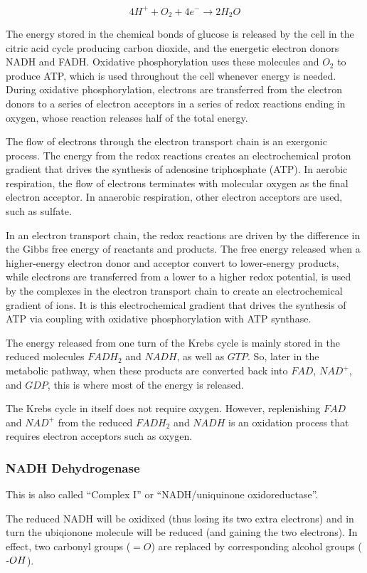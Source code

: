 \documentclass{article}
\def\mhyphen{{\hbox{-}}}
\begin{document}
\[
    4H^+ + O_2 + 4e^- \rightarrow 2H_2O
\]

The energy stored in the chemical bonds of glucose is released by the cell in the citric
acid cycle producing carbon dioxide, and the energetic electron donors NADH and FADH\@.
Oxidative phosphorylation uses these molecules and $O_2$ to produce ATP, which is used
throughout the cell whenever energy is needed. During oxidative phosphorylation, electrons
are transferred from the electron donors to a series of electron acceptors in a series of
redox reactions ending in oxygen, whose reaction releases half of the total energy.

The flow of electrons through the electron transport chain is an exergonic process. The
energy from the redox reactions creates an electrochemical proton gradient that drives the
synthesis of adenosine triphosphate (ATP). In aerobic respiration, the flow of electrons
terminates with molecular oxygen as the final electron acceptor. In anaerobic respiration,
other electron acceptors are used, such as sulfate.

In an electron transport chain, the redox reactions are driven by the difference in the
Gibbs free energy of reactants and products. The free energy released when a higher-energy
electron donor and acceptor convert to lower-energy products, while electrons are
transferred from a lower to a higher redox potential, is used by the complexes in the
electron transport chain to create an electrochemical gradient of ions. It is this
electrochemical gradient that drives the synthesis of ATP via coupling with oxidative
phosphorylation with ATP synthase.

The energy released from one turn of the Krebs cycle is mainly stored in the reduced
molecules $FADH_2$ and $NADH$, as well as $GTP$. So, later in the metabolic pathway, when
these products are converted back into $FAD$, $NAD^+$, and $GDP$, this is where most of
the energy is released.

The Krebs cycle in itself does not require oxygen. However, replenishing $FAD$ and $NAD^+$
from the reduced $FADH_2$ and $NADH$ is an oxidation process that requires electron
acceptors such as oxygen.

\subsubsection{NADH Dehydrogenase}
This is also called ``Complex I'' or ``NADH/uniquinone oxidoreductase''.

The reduced NADH will be oxidixed (thus losing its two extra electrons) and in turn
the ubiqionone molecule will be reduced (and gaining the two electrons).
In effect, two carbonyl groups ($=O$) are replaced by corresponding alcohol groups
(${\mhyphen}OH$).
\end{document}
